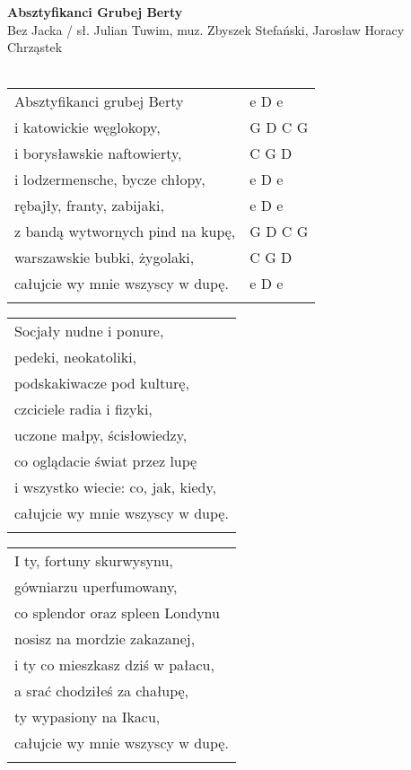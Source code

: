 \documentclass[a5paper]{article}
\begin{document}


\noindent
\fontsize{12pt}{15pt}\selectfont
\textbf{Absztyfikanci Grubej Berty} \\
\fontsize{8pt}{10pt}\selectfont
Bez Jacka / sł. Julian Tuwim, muz. Zbyszek Stefański, Jarosław Horacy Chrząstek \\ \\
\fontsize{10pt}{12pt}\selectfont
{}
\begin{tabular}{@{}p{9.0cm}p{3cm}@{}}
\noindent
Absztyfikanci grubej Berty & e D e \\
i katowickie węglokopy, & G D C G \\
i borysławskie naftowierty, & C G D \\
i lodzermensche, bycze chłopy, & e D e \\
rębajły, franty, zabijaki, & e D e \\
z bandą wytwornych pind na kupę, & G D C G \\
warszawskie bubki, żygolaki, & C G D \\
całujcie wy mnie wszyscy w dupę. & e D e \\ \\
\end{tabular}

\noindent
\begin{tabular}{@{}p{9.5cm}@{}}
Socjały nudne i ponure, \\
pedeki, neokatoliki, \\
podskakiwacze pod kulturę, \\
czciciele radia i fizyki, \\
uczone małpy, ścisłowiedzy, \\
co oglądacie świat przez lupę \\
i wszystko wiecie: co, jak, kiedy, \\
całujcie wy mnie wszyscy w dupę. \\ \\
\end{tabular}

\noindent
\begin{tabular}{@{}p{9.5cm}@{}}
I ty, fortuny skurwysynu, \\
gówniarzu uperfumowany, \\
co splendor oraz spleen Londynu \\
nosisz na mordzie zakazanej, \\
i ty co mieszkasz dziś w pałacu, \\
a srać chodziłeś za chałupę, \\
ty wypasiony na Ikacu, \\
całujcie wy mnie wszyscy w dupę. \\ \\
\end{tabular}
\end{document}
